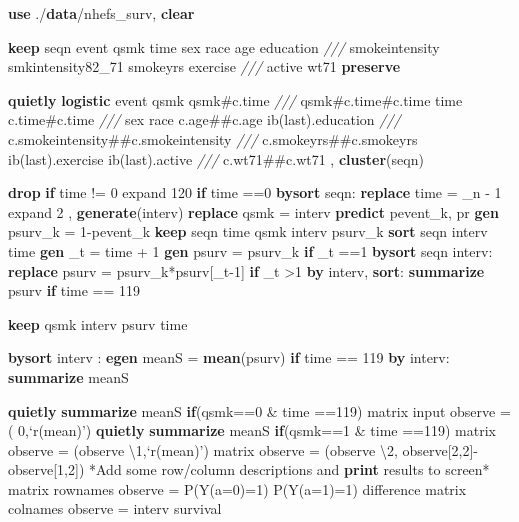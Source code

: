 \documentclass[
  10pt,
]{book}
\newenvironment{Shaded}{\begin{snugshade}}{\end{snugshade}}
\newcommand{\CommentTok}[1]{\textcolor[rgb]{0.56,0.35,0.01}{\textit{#1}}}
\newcommand{\DataTypeTok}[1]{\textcolor[rgb]{0.13,0.29,0.53}{#1}}
\newcommand{\FunctionTok}[1]{\textcolor[rgb]{0.00,0.00,0.00}{#1}}
\newcommand{\KeywordTok}[1]{\textcolor[rgb]{0.13,0.29,0.53}{\textbf{#1}}}
\newcommand{\NormalTok}[1]{#1}
\newcommand{\OtherTok}[1]{\textcolor[rgb]{0.56,0.35,0.01}{#1}}
\begin{document}
\begin{Shaded}
\begin{Highlighting}[]
\KeywordTok{use}\NormalTok{ ./}\KeywordTok{data}\NormalTok{/nhefs_surv, }\KeywordTok{clear}

\KeywordTok{keep}\NormalTok{ seqn event qsmk time sex race age education }\CommentTok{///}
\NormalTok{  smokeintensity smkintensity82_71  smokeyrs exercise }\CommentTok{///}
\NormalTok{  active wt71 }
\KeywordTok{preserve}
 
\KeywordTok{quietly} \KeywordTok{logistic}\NormalTok{ event qsmk qsmk#c.time }\CommentTok{///}
\NormalTok{  qsmk#c.time#c.time time c.time#c.time  }\CommentTok{///}
\NormalTok{	sex race c.age##c.age ib(}\FunctionTok{last}\NormalTok{).education }\CommentTok{///}
\NormalTok{	c.smokeintensity##c.smokeintensity }\CommentTok{///}
\NormalTok{	c.smokeyrs##c.smokeyrs ib(}\FunctionTok{last}\NormalTok{).exercise ib(}\FunctionTok{last}\NormalTok{).active }\CommentTok{///}
\NormalTok{	c.wt71##c.wt71 , }\KeywordTok{cluster}\NormalTok{(seqn) }
			
\KeywordTok{drop} \KeywordTok{if}\NormalTok{ time != 0}
\NormalTok{expand 120 }\KeywordTok{if}\NormalTok{ time ==0 }
\KeywordTok{bysort}\NormalTok{ seqn: }\KeywordTok{replace}\NormalTok{ time = }\DataTypeTok{_n}\NormalTok{ - 1		 		}
\NormalTok{expand 2 , }\KeywordTok{generate}\NormalTok{(interv) }
\KeywordTok{replace}\NormalTok{ qsmk = interv 		 }
\KeywordTok{predict}\NormalTok{ pevent_k, pr}
\KeywordTok{gen}\NormalTok{ psurv_k = 1-pevent_k}
\KeywordTok{keep}\NormalTok{ seqn  time qsmk interv psurv_k 		       	}
\KeywordTok{sort}\NormalTok{ seqn interv time}
\KeywordTok{gen}\NormalTok{ _t = time + 1}
\KeywordTok{gen}\NormalTok{ psurv = psurv_k }\KeywordTok{if}\NormalTok{ _t ==1 		}
\KeywordTok{bysort}\NormalTok{ seqn interv: }\KeywordTok{replace}\NormalTok{ psurv = psurv_k*psurv[_t-1] }\KeywordTok{if}\NormalTok{ _t >1 }
\KeywordTok{by}\NormalTok{ interv, }\KeywordTok{sort}\NormalTok{: }\KeywordTok{summarize}\NormalTok{ psurv }\KeywordTok{if}\NormalTok{ time == 119}

\KeywordTok{keep}\NormalTok{ qsmk interv psurv time   }
		
\KeywordTok{bysort}\NormalTok{ interv : }\KeywordTok{egen}\NormalTok{ meanS = }\KeywordTok{mean}\NormalTok{(psurv) }\KeywordTok{if}\NormalTok{ time == 119}
\KeywordTok{by}\NormalTok{ interv: }\KeywordTok{summarize}\NormalTok{ meanS}

\KeywordTok{quietly} \KeywordTok{summarize}\NormalTok{ meanS }\KeywordTok{if}\NormalTok{(qsmk==0  & time ==119)}
\FunctionTok{matrix}\NormalTok{ input observe = ( 0,}\OtherTok{`r(mean)'}\NormalTok{)}
\KeywordTok{quietly} \KeywordTok{summarize}\NormalTok{ meanS }\KeywordTok{if}\NormalTok{(qsmk==1  & time ==119)}
\FunctionTok{matrix}\NormalTok{ observe = (observe \textbackslash{}1,}\OtherTok{`r(mean)'}\NormalTok{)}
\FunctionTok{matrix}\NormalTok{ observe = (observe \textbackslash{}2, observe[2,2]-observe[1,2]) }
\NormalTok{*Add some }\OtherTok{row}\NormalTok{/column descriptions and }\KeywordTok{print}\NormalTok{ results to screen*}
\FunctionTok{matrix} \OtherTok{rownames}\NormalTok{ observe =  P(Y(a=0)=1) P(Y(a=1)=1) difference}
\FunctionTok{matrix} \OtherTok{colnames}\NormalTok{ observe = interv survival}


\end{Highlighting}
\end{Shaded}
\end{document}
